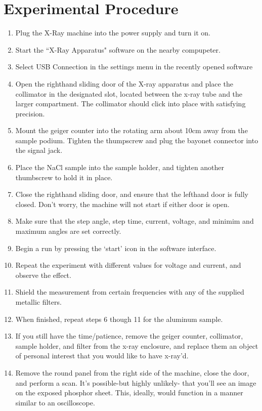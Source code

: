 \documentclass{amsart}
\begin{document}
\section{Experimental Procedure}
\begin{enumerate}
\item Plug the X-Ray machine into the power supply and turn it on.
\item Start the ``X-Ray Apparatus" software on the nearby compupeter.
\item Select USB Connection in the settings menu in the recently opened software
\item Open the righthand sliding door of the X-ray apparatus and place the collimator in the designated slot, located between the x-ray tube and the larger compartment. The collimator should click into place with satisfying precision.
\item Mount the geiger counter into the rotating arm about 10cm away from the sample podium. Tighten the thumpscrew and plug the bayonet connector into the signal jack.
\item Place the NaCl sample into the sample holder, and tighten another thumbscrew to hold it in place.
\item Close the righthand sliding door, and ensure that the lefthand door is fully closed. Don't worry, the machine will not start if either door is open.
\item Make sure that the step angle, step time, current, voltage, and minimim and maximum angles are set correctly.
\item Begin a run by pressing the `start' icon in the software interface.
\item Repeat the experiment with different values for voltage and current, and observe the effect.
\item Shield the measurement from certain frequencies with any of the supplied metallic filters.
\item When finished, repeat steps 6 though 11 for the aluminum sample.
\item If you still have the time/patience, remove the geiger counter, collimator, sample holder, and filter from the x-ray enclosure, and replace them an object of personal interest that you would like to have x-ray'd.
\item Remove the round panel from the right side of the machine, close the door, and perform a scan. It's possible\--but highly unlikely\-- that you'll see an image on the exposed phosphor sheet. This, ideally, would function in a manner similar to an oscilloscope.
\end{enumerate}
\end{document}
